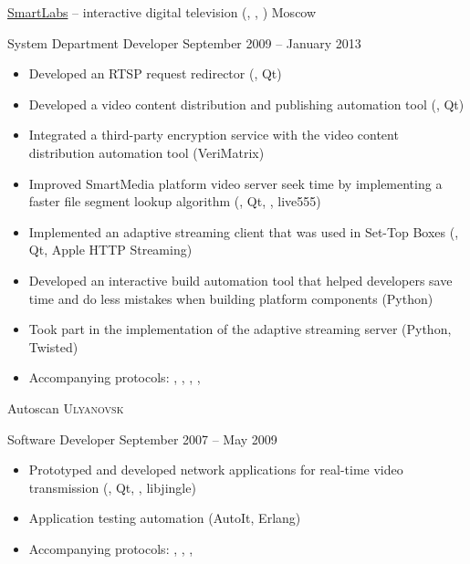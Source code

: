 \documentclass[unicode, 10pt, a4paper, oneside, fleqn]{article}
\begin{document}
\job  %
    {\href{http://www.smartlabs.tv}{SmartLabs} -- interactive digital
           television (, , )}
    {Moscow}
    {
        \position %
            {System Department Developer}
            {September 2009 -- January 2013}
            {
                \begin{itemize}
                    \item{Developed an RTSP request redirector (\CPP, Qt)}
                    \item{Developed a video content distribution and publishing
                          automation tool (\CPP, Qt)}
                    \item{Integrated a third-party encryption service with the
                          video content distribution automation tool (VeriMatrix)}
                    \item{Improved SmartMedia platform video server seek time by
                          implementing a faster file segment lookup algorithm
                          (\CPP, Qt, , live555)}
                    \item{Implemented an adaptive streaming client that was used
                          in Set-Top Boxes (\CPP, Qt, Apple HTTP Streaming)}
                    \item{Developed an interactive build automation tool that
                          helped developers save time and do less mistakes when
                          building platform components (Python)}
                    \item{Took part in the implementation of the adaptive
                          streaming server (Python, Twisted)}
                    \item{Accompanying protocols: , ,
                          , , }
                \end{itemize}
            }
    }


\job
    {Autoscan}
    {\textsc{Ulyanovsk}}
    {
        \position
            {Software Developer}
            {September 2007 -- May 2009}
            {
                \begin{itemize}
                    \item{Prototyped and developed network applications for
                          real-time video transmission
                          (\CPP, Qt, , libjingle)}
                    \item{Application testing automation (AutoIt, Erlang)}
                    \item{Accompanying protocols: , , ,
                          }
                \end{itemize}
            }
    }
\end{document}
